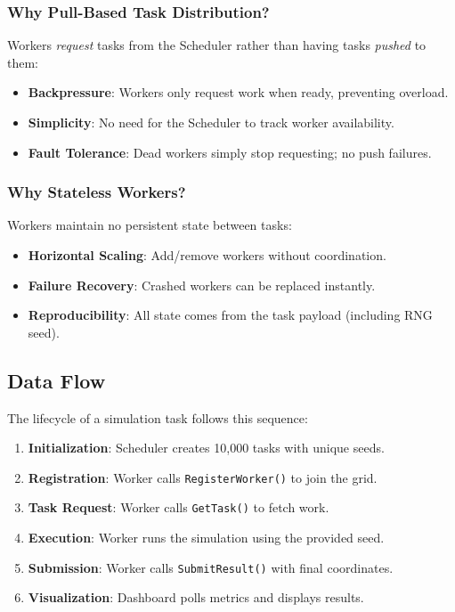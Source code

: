 \subsubsection{Why Pull-Based Task Distribution?}
Workers \textit{request} tasks from the Scheduler rather than having tasks \textit{pushed} to them:
\begin{itemize}
    \item \textbf{Backpressure}: Workers only request work when ready, preventing overload.
    \item \textbf{Simplicity}: No need for the Scheduler to track worker availability.
    \item \textbf{Fault Tolerance}: Dead workers simply stop requesting; no push failures.
\end{itemize}

\subsubsection{Why Stateless Workers?}
Workers maintain no persistent state between tasks:
\begin{itemize}
    \item \textbf{Horizontal Scaling}: Add/remove workers without coordination.
    \item \textbf{Failure Recovery}: Crashed workers can be replaced instantly.
    \item \textbf{Reproducibility}: All state comes from the task payload (including RNG seed).
\end{itemize}

\subsection{Data Flow}

The lifecycle of a simulation task follows this sequence:

\begin{enumerate}
    \item \textbf{Initialization}: Scheduler creates 10,000 tasks with unique seeds.
    \item \textbf{Registration}: Worker calls \texttt{RegisterWorker()} to join the grid.
    \item \textbf{Task Request}: Worker calls \texttt{GetTask()} to fetch work.
    \item \textbf{Execution}: Worker runs the simulation using the provided seed.
    \item \textbf{Submission}: Worker calls \texttt{SubmitResult()} with final coordinates.
    \item \textbf{Visualization}: Dashboard polls metrics and displays results.
\end{enumerate}

